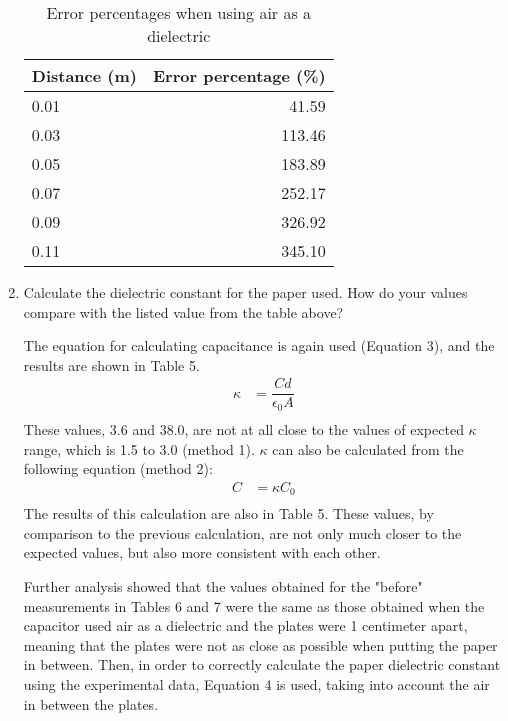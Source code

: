 \documentclass [12pt, letterpaper, twoside] {article}
\begin{document}
\begin{enumerate}
  \begin{table}
    \centering
    \begin{tabular}{| l | r |}
      \hline\hline
      Distance (m) & Error percentage (\%) \\
      \hline
      0.01 & 41.59 \\ %
      \hline
      0.03 & 113.46 \\ %
      \hline
      0.05 & 183.89 \\ %
      \hline
      0.07 & 252.17 \\ %
      \hline
      0.09 & 326.92 \\ %
      \hline
      0.11 & 345.10 \\ %
      \hline\hline
    \end{tabular}
    \caption{Error percentages when using air as a dielectric}
  \end{table}

  \item  Calculate the dielectric constant for the paper used.  How do your values compare with the listed value from the table above?
  
  The equation for calculating capacitance is again used (Equation 3), and the results are shown in Table 5.
  \begin{equation*}
    \begin{split}
      \kappa &= \dfrac{Cd}{\epsilon_{0}A} \\
    \end{split}
  \end{equation*}
  These values, 3.6 and 38.0, are not at all close to the values of expected \(\kappa\) range, which is 1.5 to 3.0 (method 1). \(\kappa\) can also be calculated from the following equation (method 2):
  \begin{equation*}
    \begin{split}
      C &= \kappa{C}_0 \\
    \end{split}
  \end{equation*}
  The results of this calculation are also in Table 5. These values, by comparison to the previous calculation, are not only much closer to the expected values, but also more consistent with each other.
  
  Further analysis showed that the values obtained for the "before" measurements in Tables 6 and 7 were the same as those obtained when the capacitor used air as a dielectric and the plates were 1 centimeter apart, meaning that the plates were not as close as possible when putting the paper in between. Then, in order to correctly calculate the paper dielectric constant using the experimental data, Equation 4 is used, taking into account the air in between the plates.


\end{enumerate}
\end{document}
